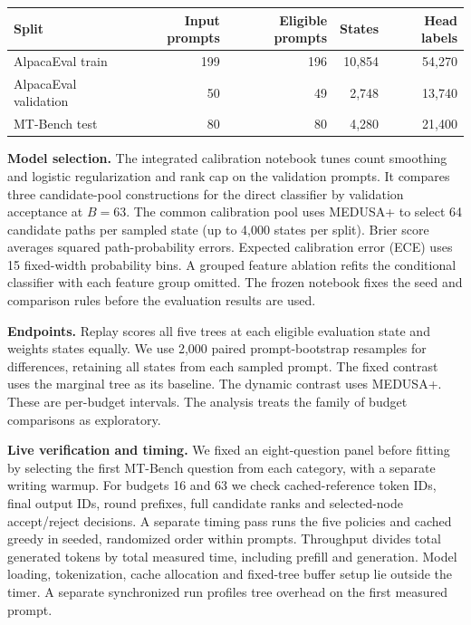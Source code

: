 \begin{center}
\begin{tabular}{lrrrr}\toprule
Split & Input prompts & Eligible prompts & States & Head labels\\\midrule
AlpacaEval train & 199 & 196 & 10,854 & 54,270\\
AlpacaEval validation & 50 & 49 & 2,748 & 13,740\\
MT-Bench test & 80 & 80 & 4,280 & 21,400\\\bottomrule
\end{tabular}
\end{center}
\textbf{Model selection.} The integrated calibration notebook tunes count smoothing and logistic regularization and rank cap on the validation prompts. It compares three candidate-pool constructions for the direct classifier by validation acceptance at $B=63$. The common calibration pool uses MEDUSA+ to select 64 candidate paths per sampled state (up to 4,000 states per split). Brier score averages squared path-probability errors. Expected calibration error (ECE) uses 15 fixed-width probability bins. A grouped feature ablation refits the conditional classifier with each feature group omitted. The frozen notebook fixes the seed and comparison rules before the evaluation results are used.

\textbf{Endpoints.} Replay scores all five trees at each eligible evaluation state and weights states equally. We use 2,000 paired prompt-bootstrap resamples for differences, retaining all states from each sampled prompt. The fixed contrast uses the marginal tree as its baseline. The dynamic contrast uses MEDUSA+. These are per-budget intervals. The analysis treats the family of budget comparisons as exploratory.

\textbf{Live verification and timing.} We fixed an eight-question panel before fitting by selecting the first MT-Bench question from each category, with a separate writing warmup. For budgets 16 and 63 we check cached-reference token IDs, final output IDs, round prefixes, full candidate ranks and selected-node accept/reject decisions. A separate timing pass runs the five policies and cached greedy in seeded, randomized order within prompts. Throughput divides total generated tokens by total measured time, including prefill and generation. Model loading, tokenization, cache allocation and fixed-tree buffer setup lie outside the timer. A separate synchronized run profiles tree overhead on the first measured prompt.
